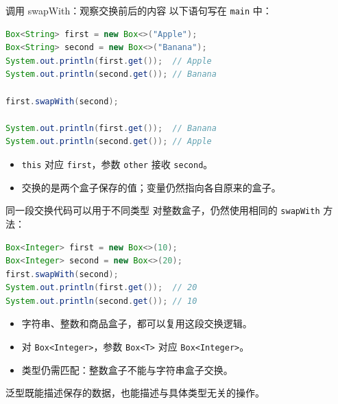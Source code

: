 \documentclass[aspectratio=169]{beamer}
\begin{document}
\begin{frame}[fragile]{调用 swapWith：观察交换前后的内容}
  以下语句写在 \texttt{main} 中：
  \begin{lstlisting}[language=Java]
Box<String> first = new Box<>("Apple");
Box<String> second = new Box<>("Banana");
System.out.println(first.get());  // Apple
System.out.println(second.get()); // Banana

first.swapWith(second);

System.out.println(first.get());  // Banana
System.out.println(second.get()); // Apple
  \end{lstlisting}
  \begin{itemize}
    \item \texttt{this} 对应 \texttt{first}，参数 \texttt{other} 接收 \texttt{second}。
    \item 交换的是两个盒子保存的值；变量仍然指向各自原来的盒子。
  \end{itemize}
\end{frame}

\begin{frame}[fragile]{同一段交换代码可以用于不同类型}
  对整数盒子，仍然使用相同的 \texttt{swapWith} 方法：
  \begin{lstlisting}[language=Java]
Box<Integer> first = new Box<>(10);
Box<Integer> second = new Box<>(20);
first.swapWith(second);
System.out.println(first.get());  // 20
System.out.println(second.get()); // 10
  \end{lstlisting}
  \begin{itemize}
    \item 字符串、整数和商品盒子，都可以复用这段交换逻辑。
    \item 对 \texttt{Box<Integer>}，参数 \texttt{Box<T>} 对应 \texttt{Box<Integer>}。
    \item 类型仍需匹配：整数盒子不能与字符串盒子交换。
  \end{itemize}
  \medskip
  \alert{泛型既能描述保存的数据，也能描述与具体类型无关的操作。}
\end{frame}

\end{document}

